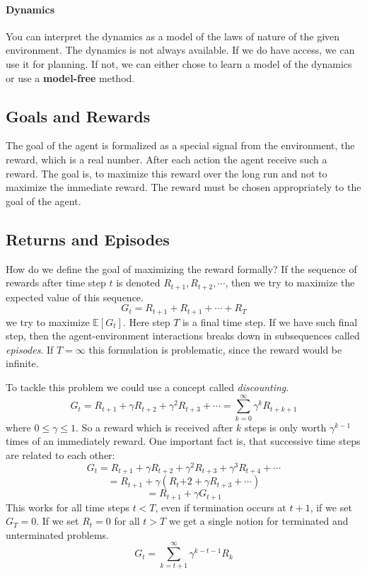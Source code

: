 \documentclass[10pt,a4paper]{article}
\begin{document}
\paragraph{Dynamics}
You can interpret the dynamics as a model of the laws of nature of the given environment. The dynamics is not always available. If we do have access, we can use it for planning. If not, we can either chose to learn a model of the dynamics or use a \textbf{model-free} method.

\subsection{Goals and Rewards}
The goal of the agent is formalized as a special signal from the environment, the reward, which is a real number. After each action the agent receive such a reward. The goal is, to maximize this reward over the long run and not to maximize the immediate reward. The reward must be chosen appropriately to the goal of the agent. 

\subsection{Returns and Episodes}
How do we define the goal of maximizing the reward formally? If the sequence of rewards after time step $t$ is denoted $R_{t+1}, R_{t+2}, \cdots$, then we try to maximize the expected value of this sequence.
\[ G_t = R_{t+1} + R_{t+1} + \cdots + R_{T} \]
we try to maximize $\mathbb{E}[G_t]$. Here step $T$ is a final time step. If we have such final step, then the agent-environment interactions breaks down in subsequences called \textit{episodes}. If $T=\infty$ this formulation is problematic, since the reward would be infinite.

To tackle this problem we could use a concept called \textit{discounting}. 
\[ G_t = R_{t+1} + \gamma R_{t+2} + \gamma^2 R_{t+3} + \cdots = \sum_{k=0}^{\infty} \gamma^k R_{t+k+1} \]
where $ 0 \le \gamma \le 1$. So a reward which is received after $k$ steps is only worth $\gamma^{k-1}$ times of an immediately reward.
One important fact is, that successive time steps are related to each other:
\[ G_t = R_{t+1} + \gamma R_{t+2} + \gamma^2 R_{t+3} + \gamma^3 R_{t+4} + \cdots \]
\[ = R_{t+1} + \gamma(R_t{+2} + \gamma R_{t+3} + \cdots ) \]
\[ = R_{t+1} + \gamma G_{t+1} \]
This works for all time steps $t < T$, even if termination occurs at $t+1$, if we set $G_T=0$.
If we set $R_t=0$ for all $t > T$ we get a single notion for terminated and unterminated problems.
\[ G_t = \sum_{k=t+1}^{\infty} \gamma^{k-t-1} R_k\]
\end{document}
